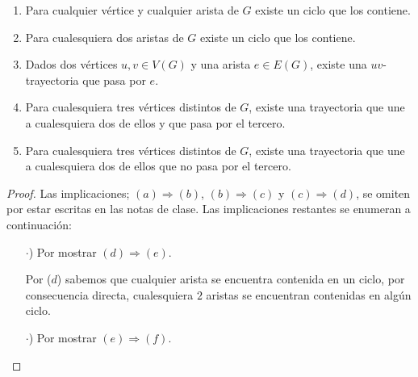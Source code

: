 \documentclass{article}
\begin{document}
\begin{enumerate}
\begin{enumerate}
  \item Para cualquier v\'ertice y cualquier arista de $G$ existe un ciclo
    que los contiene.

  \item Para cualesquiera dos aristas de $G$ existe un ciclo que los
    contiene.

  \item Dados dos v\'ertices $u,v \in V(G)$ y una arista $e \in E(G)$,
    existe una $uv$-trayectoria que pasa por $e$.

  \item Para cualesquiera tres v\'ertices distintos de $G$, existe una
    trayectoria que une a cualesquiera dos de ellos y que pasa por el
    tercero.

  \item Para cualesquiera tres v\'ertices distintos de $G$, existe una
    trayectoria que une a cualesquiera dos de ellos que no pasa por el
    tercero.
  \end{enumerate}
  \begin{proof}
    
    Las implicaciones; $(a) \Rightarrow (b)$, $(b) \Rightarrow (c)$
    y $(c) \Rightarrow (d)$, se omiten por estar escritas en las
    notas de clase. Las implicaciones restantes se enumeran a
    continuación:
    \begin{itemize}
    \item[$\cdot$)] Por mostrar $(d) \Rightarrow (e)$.
      
      Por ($d$) sabemos que cualquier arista se encuentra
      contenida en un ciclo, por consecuencia directa,
      cualesquiera $2$ aristas se encuentran contenidas en
      algún ciclo.
    \item[$\cdot$)] Por mostrar $(e) \Rightarrow (f)$.
      

\end{itemize}
\end{proof}
\end{enumerate}
\end{document}
